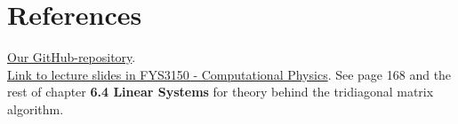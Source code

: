 \documentclass{article}
\begin{document}
\clearpage

\vspace{1cm}

\section{References} \label{sec:References}


\href{https://github.com/Erikbgram/Fys3150}{Our GitHub-repository}. \\

\href{https://github.com/CompPhysics/ComputationalPhysics/blob/master/doc/Lectures/lectures2015.pdf}{Link to lecture slides in FYS3150 - Computational Physics}. See page 168 and the rest of chapter \textbf{6.4 Linear Systems} for theory behind the tridiagonal matrix algorithm.






\end{document}
